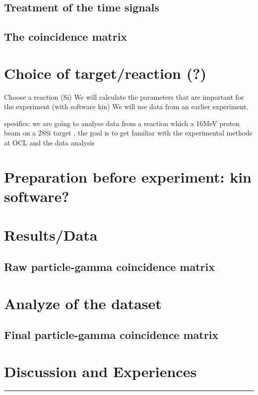 \documentclass[11pt,a4wide]{article}
\begin{document}
\subsection{Treatment of the time signals}

\subsection{ The coincidence matrix}

\section{Choice of target/reaction (?)}

Choose a reaction (Si)
We will calculate the parameters that are important for the experiment (with software kin)
We will use data from an earlier experiment.


spesifics:
we are going to analyse data from a reaction which a 16MeV proton beam on a 28Si target . the goal is to get familiar with the experimental methods at OCL and the data analysis



\section{Preparation before experiment: kin software?}

\section{Results/Data}
\subsection{Raw particle-gamma coincidence matrix}

\section{Analyze of the dataset}
\subsection{Final particle-gamma coincidence matrix}


\section{Discussion and Experiences}


\noindent\rule{\textwidth}{1pt}
\end{document}
